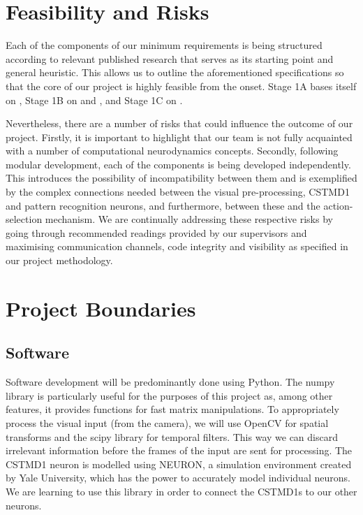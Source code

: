 \documentclass[a4paper,11pt]{article}
\begin{document}

\section{Feasibility and Risks}

Each of the components of our minimum requirements is being structured according to relevant published research that serves as its starting point and general heuristic. This allows us to outline the aforementioned specifications so that the core of our project is highly feasible from the onset. Stage 1A bases itself on \cite{hal11}, Stage 1B on \cite{stdp1} and \cite{stdp2}, and Stage 1C on \cite{tsdn}.

Nevertheless, there are a number of risks that could influence the outcome of our project. Firstly, it is important to highlight that our team is not fully acquainted with a number of computational neurodynamics concepts. Secondly, following modular development, each of the components is being developed independently. This introduces the possibility of incompatibility between them and is exemplified by the complex connections needed between the visual pre-processing, CSTMD1 and pattern recognition neurons, and furthermore, between these and the action-selection mechanism. We are continually addressing these respective risks by going through recommended readings provided by our supervisors and maximising communication channels, code integrity and visibility as specified in our project methodology.

\section{Project Boundaries}

\subsection{Software}
Software development will be predominantly done using Python. The numpy library is particularly useful for the purposes of this project as, among other features, it provides functions for fast matrix manipulations. To appropriately process the visual input (from the camera), we will use OpenCV for spatial transforms and the scipy library for temporal filters. This way we can discard irrelevant information before the frames of the input are sent for processing. The CSTMD1 neuron is modelled using NEURON, a simulation environment created by Yale University, which has the power to accurately model individual neurons. We are learning to use this library in order to connect the CSTMD1s to our other neurons.
\end{document}
